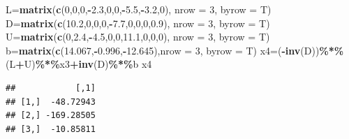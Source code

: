 \documentclass[
]{article}
\newenvironment{Shaded}{\begin{snugshade}}{\end{snugshade}}
\newcommand{\AttributeTok}[1]{\textcolor[rgb]{0.13,0.29,0.53}{#1}}
\newcommand{\DecValTok}[1]{\textcolor[rgb]{0.00,0.00,0.81}{#1}}
\newcommand{\FloatTok}[1]{\textcolor[rgb]{0.00,0.00,0.81}{#1}}
\newcommand{\FunctionTok}[1]{\textcolor[rgb]{0.13,0.29,0.53}{\textbf{#1}}}
\newcommand{\NormalTok}[1]{#1}
\newcommand{\OtherTok}[1]{\textcolor[rgb]{0.56,0.35,0.01}{#1}}
\newcommand{\SpecialCharTok}[1]{\textcolor[rgb]{0.81,0.36,0.00}{\textbf{#1}}}
\begin{document}
\begin{Shaded}
\begin{Highlighting}[]
\NormalTok{  L}\OtherTok{=}\FunctionTok{matrix}\NormalTok{(}\FunctionTok{c}\NormalTok{(}\DecValTok{0}\NormalTok{,}\DecValTok{0}\NormalTok{,}\DecValTok{0}\NormalTok{,}\SpecialCharTok{{-}}\FloatTok{2.3}\NormalTok{,}\DecValTok{0}\NormalTok{,}\DecValTok{0}\NormalTok{,}\SpecialCharTok{{-}}\FloatTok{5.5}\NormalTok{,}\SpecialCharTok{{-}}\FloatTok{3.2}\NormalTok{,}\DecValTok{0}\NormalTok{), }\AttributeTok{nrow =} \DecValTok{3}\NormalTok{, }\AttributeTok{byrow =}\NormalTok{ T)}
\NormalTok{  D}\OtherTok{=}\FunctionTok{matrix}\NormalTok{(}\FunctionTok{c}\NormalTok{(}\FloatTok{10.2}\NormalTok{,}\DecValTok{0}\NormalTok{,}\DecValTok{0}\NormalTok{,}\DecValTok{0}\NormalTok{,}\SpecialCharTok{{-}}\FloatTok{7.7}\NormalTok{,}\DecValTok{0}\NormalTok{,}\DecValTok{0}\NormalTok{,}\DecValTok{0}\NormalTok{,}\FloatTok{0.9}\NormalTok{), }\AttributeTok{nrow =} \DecValTok{3}\NormalTok{, }\AttributeTok{byrow =}\NormalTok{ T)}
\NormalTok{  U}\OtherTok{=}\FunctionTok{matrix}\NormalTok{(}\FunctionTok{c}\NormalTok{(}\DecValTok{0}\NormalTok{,}\FloatTok{2.4}\NormalTok{,}\SpecialCharTok{{-}}\FloatTok{4.5}\NormalTok{,}\DecValTok{0}\NormalTok{,}\DecValTok{0}\NormalTok{,}\FloatTok{11.1}\NormalTok{,}\DecValTok{0}\NormalTok{,}\DecValTok{0}\NormalTok{,}\DecValTok{0}\NormalTok{), }\AttributeTok{nrow =} \DecValTok{3}\NormalTok{, }\AttributeTok{byrow =}\NormalTok{ T)}
\NormalTok{  b}\OtherTok{=}\FunctionTok{matrix}\NormalTok{(}\FunctionTok{c}\NormalTok{(}\FloatTok{14.067}\NormalTok{,}\SpecialCharTok{{-}}\FloatTok{0.996}\NormalTok{,}\SpecialCharTok{{-}}\FloatTok{12.645}\NormalTok{),}\AttributeTok{nrow =} \DecValTok{3}\NormalTok{, }\AttributeTok{byrow =}\NormalTok{ T)}
\NormalTok{  x4}\OtherTok{=}\NormalTok{(}\SpecialCharTok{{-}}\FunctionTok{inv}\NormalTok{(D))}\SpecialCharTok{\%*\%}\NormalTok{(L}\SpecialCharTok{+}\NormalTok{U)}\SpecialCharTok{\%*\%}\NormalTok{x3}\SpecialCharTok{+}\FunctionTok{inv}\NormalTok{(D)}\SpecialCharTok{\%*\%}\NormalTok{b}
\NormalTok{  x4}
\end{Highlighting}
\end{Shaded}

\begin{verbatim}
##            [,1]
## [1,]  -48.72943
## [2,] -169.28505
## [3,]  -10.85811
\end{verbatim}
\end{document}
